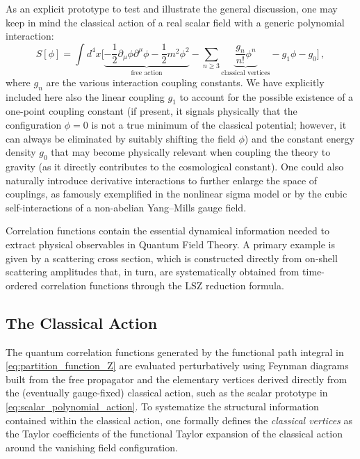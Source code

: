 As an explicit prototype to test and illustrate the general discussion, one may keep in mind the classical action of a real scalar field with a generic polynomial interaction:
\begin{equation} \label{eq:scalar_polynomial_action}
    S[\phi] = \int d^4x \Bigg[ \underbrace{-\frac{1}{2}\partial_\mu\phi\partial^\mu\phi - \frac{1}{2}m^2\phi^2}_{\text{free action}} - \sum_{n \ge 3} \underbrace{\frac{g_n}{n!}\phi^n}_{\text{classical vertices}} - g_1\phi - g_0 \Bigg] \, ,
\end{equation}
where \(g_n\) are the various interaction coupling constants. We have explicitly included here also the linear coupling \(g_1\) to account for the possible existence of a one-point coupling constant (if present, it signals physically that the configuration \(\phi = 0\) is not a true minimum of the classical potential; however, it can always be eliminated by suitably shifting the field \(\phi\)) and the constant energy density \(g_0\) that may become physically relevant when coupling the theory to gravity (as it directly contributes to the cosmological constant). One could also naturally introduce derivative interactions to further enlarge the space of couplings, as famously exemplified in the nonlinear sigma model or by the cubic self-interactions of a non-abelian Yang--Mills gauge field.

Correlation functions contain the essential dynamical information needed to extract physical observables in Quantum Field Theory. A primary example is given by a scattering cross section, which is constructed directly from on-shell scattering amplitudes that, in turn, are systematically obtained from time-ordered correlation functions through the LSZ reduction formula.

\subsection{The Classical Action}

The quantum correlation functions generated by the functional path integral in \eqref{eq:partition_function_Z} are evaluated perturbatively using Feynman diagrams built from the free propagator and the elementary vertices derived directly from the (eventually gauge-fixed) classical action, such as the scalar prototype in \eqref{eq:scalar_polynomial_action}. To systematize the structural information contained within the classical action, one formally defines the \textit{classical vertices} as the Taylor coefficients of the functional Taylor expansion of the classical action around the vanishing field configuration.

